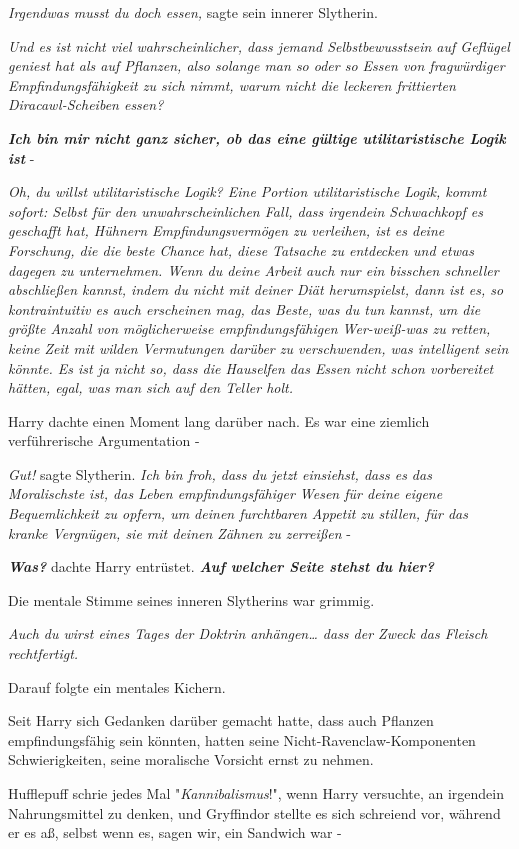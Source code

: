 {\emph{Irgendwas musst du doch essen,} sagte sein innerer Slytherin.

\emph{Und es ist nicht viel wahrscheinlicher, dass jemand Selbstbewusstsein auf Geflügel geniest hat als auf Pflanzen, also solange man so oder so Essen von fragwürdiger Empfindungsfähigkeit zu sich nimmt, warum nicht die leckeren frittierten Diracawl-Scheiben essen?}

\textbf{\emph{Ich bin mir nicht ganz sicher, ob das eine gültige utilitaristische Logik ist}} -

\emph{Oh, du willst utilitaristische Logik? Eine Portion utilitaristische Logik, kommt sofort: Selbst für den unwahrscheinlichen Fall, dass irgendein Schwachkopf es geschafft hat, Hühnern Empfindungsvermögen zu verleihen, ist es deine Forschung, die die beste Chance hat, diese Tatsache zu entdecken und etwas dagegen zu unternehmen. Wenn du deine Arbeit auch nur ein bisschen schneller abschließen kannst, indem du nicht mit deiner Diät herumspielst, dann ist es, so kontraintuitiv es auch erscheinen mag, das Beste, was du tun kannst, um die größte Anzahl von möglicherweise empfindungsfähigen Wer-weiß-was zu retten, keine Zeit mit wilden Vermutungen darüber zu verschwenden, was intelligent sein könnte. Es ist ja nicht so, dass die Hauselfen das Essen nicht schon vorbereitet hätten, egal, was man sich auf den Teller holt.}

Harry dachte einen Moment lang darüber nach. Es war eine ziemlich verführerische Argumentation -

\emph{Gut!} sagte Slytherin. \emph{Ich bin froh, dass du jetzt einsiehst, dass es das Moralischste ist, das Leben empfindungsfähiger Wesen für deine eigene Bequemlichkeit zu opfern, um deinen furchtbaren Appetit zu stillen, für das kranke Vergnügen, sie mit deinen Zähnen zu zerreißen} -

\textbf{\emph{Was?}} dachte Harry entrüstet. \textbf{\emph{Auf welcher Seite stehst du hier?}}

Die mentale Stimme seines inneren Slytherins war grimmig.

\emph{Auch du wirst eines Tages der Doktrin anhängen… dass der Zweck das Fleisch rechtfertigt.}

Darauf folgte ein mentales Kichern.

Seit Harry sich Gedanken darüber gemacht hatte, dass auch Pflanzen empfindungsfähig sein könnten, hatten seine Nicht-Ravenclaw-Komponenten Schwierigkeiten, seine moralische Vorsicht ernst zu nehmen.

Hufflepuff schrie jedes Mal "\emph{Kannibalismus}!", wenn Harry versuchte, an irgendein Nahrungsmittel zu denken, und Gryffindor stellte es sich schreiend vor, während er es aß, selbst wenn es, sagen wir, ein Sandwich war -

}

